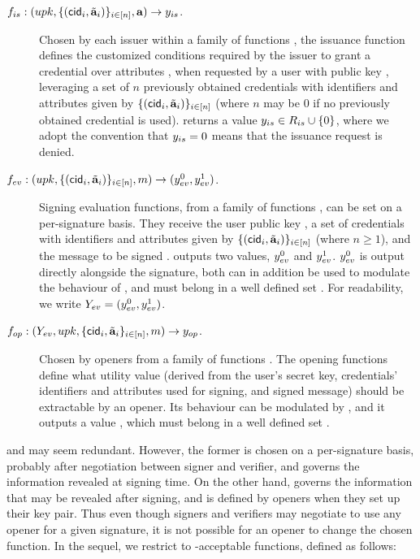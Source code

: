 \begin{description}
\item[$f_{is}: (upk,\lbrace (\mathsf{cid}_i,\tilde{\mathbf{a}}_i)\rbrace_{i \in [n]},\mathbf{a})
  \rightarrow y_{is}$.] Chosen
  by each issuer within a family of functions \famfissue, the issuance function
  defines the customized conditions required by the issuer to grant a credential
  over attributes \attrs, when requested by a user with public key \upk,
  leveraging a set of $n$ previously obtained credentials with identifiers and
  attributes given by $\lbrace (\mathsf{cid}_i,\tilde{\mathbf{a}}_i) \rbrace_{i \in [n]}$ (where
  $n$ may be $0$ if no previously obtained credential is used). \fissue returns
  a value $y_{is} \in R_{is} \cup \lbrace 0 \rbrace$, where we adopt the
  convention that $y_{is} = 0$ means that the issuance request is denied.
\item[$f_{ev}: (upk,\lbrace(\mathsf{cid}_i,\tilde{\mathbf{a}}_i)\rbrace_{i \in [n]},m)
  \rightarrow (y_{ev}^0,y_{ev}^1)$.] Signing evaluation functions, from a
  family of functions \famfeval, can be set on a per-signature basis. They
  receive the user public key \upk, a set of credentials with identifiers
  and attributes given by $\lbrace (\mathsf{cid}_i,\tilde{\mathbf{a}}_i) \rbrace_{i \in [n]}$
  (where $n \ge 1$), and the message to be signed \msg. \feval outputs two
  values, $y_{ev}^0$ and $y_{ev}^1$. $y_{ev}^0$ is output directly alongside the
  signature,  both can in addition be used to modulate the behaviour of
  \finsp, and must belong in a well defined set \rngfeval. For readability,
  we write $Y_{ev} = (y_{ev}^0,y_{ev}^1)$.
\item[$f_{op}: (Y_{ev},upk,\lbrace \mathsf{cid}_i,\tilde{\mathbf{a}}_i\rbrace_{i \in [n]},
  m) \rightarrow y_{op}$.]
  Chosen by openers from a family of functions \famfinsp. The opening
  functions define what utility value (derived from the user's secret key,
  credentials' identifiers and attributes used for signing, and signed message)
  should be extractable by an opener. Its behaviour can be modulated by \Yeval,
  and it outputs a value \yinsp, which must belong in a well defined set
  \rngfinsp.
\end{description}

\feval and \finsp may seem redundant. However, the former is chosen on a
per-signature basis, probably after negotiation between signer and verifier, and
governs the information revealed at signing time. On the other hand, \finsp
governs the information that may be revealed after signing, and is defined by
openers when they set up their key pair. Thus even though signers and verifiers
may negotiate to use any opener for a given signature, it is not possible for
an opener to change the chosen function. In the sequel, we restrict to
\UAS-acceptable functions, defined as follows:

